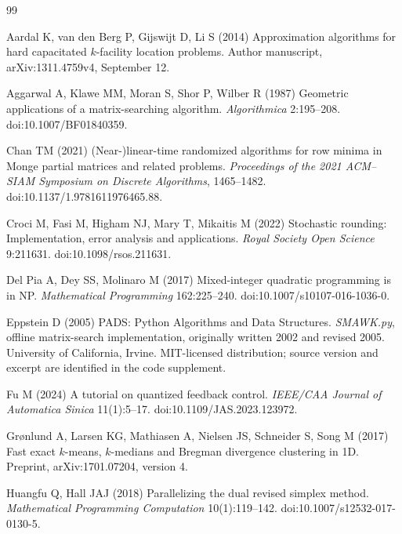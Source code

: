 \begin{thebibliography}{99}\raggedright
{}
Aardal K, van den Berg P, Gijswijt D, Li S (2014) Approximation algorithms for hard capacitated $k$-facility location problems. Author manuscript, arXiv:1311.4759v4, September 12.

Aggarwal A, Klawe MM, Moran S, Shor P, Wilber R (1987) Geometric applications of a matrix-searching algorithm. \emph{Algorithmica} 2:195--208. doi:10.1007/BF01840359.

Chan TM (2021) (Near-)linear-time randomized algorithms for row minima in Monge partial matrices and related problems. \emph{Proceedings of the 2021 ACM--SIAM Symposium on Discrete Algorithms}, 1465--1482. doi:10.1137/1.9781611976465.88.

Croci M, Fasi M, Higham NJ, Mary T, Mikaitis M (2022) Stochastic rounding: Implementation, error analysis and applications. \emph{Royal Society Open Science} 9:211631. doi:10.1098/rsos.211631.

Del Pia A, Dey SS, Molinaro M (2017) Mixed-integer quadratic programming is in NP. \emph{Mathematical Programming} 162:225--240. doi:10.1007/s10107-016-1036-0.

Eppstein D (2005) PADS: Python Algorithms and Data Structures. \emph{SMAWK.py}, offline matrix-search implementation, originally written 2002 and revised 2005. University of California, Irvine. MIT-licensed distribution; source version and excerpt are identified in the code supplement.

Fu M (2024) A tutorial on quantized feedback control. \emph{IEEE/CAA Journal of Automatica Sinica} 11(1):5--17. doi:10.1109/JAS.2023.123972.

Gr{\o}nlund A, Larsen KG, Mathiasen A, Nielsen JS, Schneider S, Song M (2017) Fast exact $k$-means, $k$-medians and Bregman divergence clustering in 1D. Preprint, arXiv:1701.07204, version 4.

Huangfu Q, Hall JAJ (2018) Parallelizing the dual revised simplex method. \emph{Mathematical Programming Computation} 10(1):119--142. doi:10.1007/s12532-017-0130-5.


\end{thebibliography}
